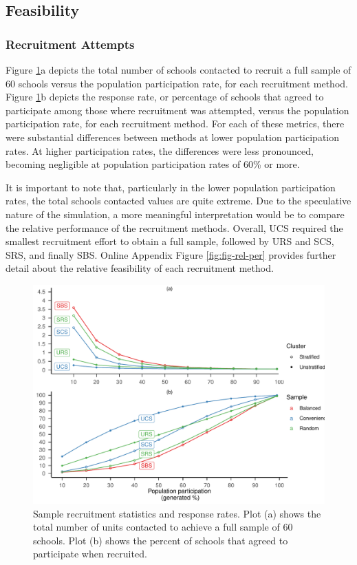\documentclass[
  english,
  man,floatsintext]{apa6}
\begin{document}
\hypertarget{feasibility-1}{%
\subsection{Feasibility}\label{feasibility-1}}

\hypertarget{recruitment-attempts}{%
\subsubsection{Recruitment Attempts}\label{recruitment-attempts}}

Figure \ref{fig:fig-responses}a depicts the total number of schools contacted to recruit a full sample of 60 schools versus the population participation rate, for each recruitment method. Figure \ref{fig:fig-responses}b depicts the response rate, or percentage of schools that agreed to participate among those where recruitment was attempted, versus the population participation rate, for each recruitment method. For each of these metrics, there were substantial differences between methods at lower population participation rates. At higher participation rates, the differences were less pronounced, becoming negligible at population participation rates of 60\% or more.

It is important to note that, particularly in the lower population participation rates, the total schools contacted values are quite extreme. Due to the speculative nature of the simulation, a more meaningful interpretation would be to compare the relative performance of the recruitment methods. Overall, UCS required the smallest recruitment effort to obtain a full sample, followed by URS and SCS, SRS, and finally SBS. Online Appendix Figure \ref{fig:fig-rel-per} provides further detail about the relative feasibility of each recruitment method.



\begin{figure}
\centering
\includegraphics{6---Paper_files/figure-latex/fig-responses-1.pdf}
\caption{\label{fig:fig-responses}Sample recruitment statistics and response rates. Plot (a) shows the total number of units contacted to achieve a full sample of 60 schools. Plot (b) shows the percent of schools that agreed to participate when recruited.}
\end{figure}
\end{document}
